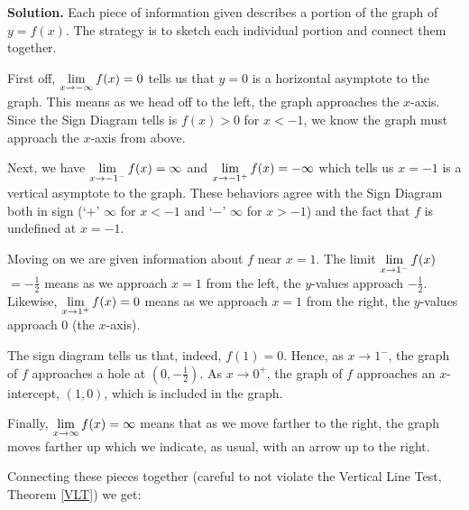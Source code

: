 \begin{ex}
\begin{center}
\end{center}



{\bf Solution.} Each piece of information given describes a portion of the graph of $y = f(x)$.  The strategy is to sketch each individual portion and connect them together.

\medskip

First off, $\displaystyle{\lim_{x \rightarrow -\infty} f(x) = 0}$ tells us that $y = 0$ is a horizontal asymptote to the graph.  This means as we head off to the left, the graph approaches the $x$-axis.  Since the Sign Diagram tells is $f(x) > 0$ for $x<-1$, we know the graph must approach the $x$-axis from above.

\medskip

Next, we have $\displaystyle{\lim_{x \rightarrow -1^{-}} f(x) = \infty}$ and  $\displaystyle{\lim_{x \rightarrow -1^{+}} f(x) = - \infty}$ which tells us $x=-1$ is a vertical asymptote to the graph.  These behaviors agree with the Sign Diagram both in sign (`$+$' $\infty$ for $x<-1$ and `$-$' $\infty$ for $x>-1$) and the fact that $f$ is undefined at $x = -1$.

\medskip

Moving on we are given information about $f$ near $x = 1$.    The limit $\displaystyle{\lim_{x \rightarrow 1^{-}} f(x)}$ $= -\frac{1}{2}$  means as we approach $x=1$ from the left, the $y$-values approach $-\frac{1}{2}$.  Likewise, $\displaystyle{\lim_{x \rightarrow 1^{+}} f(x) = 0}$ means as we approach $x=1$ from the right, the $y$-values approach $0$ (the $x$-axis).  

\medskip

The sign diagram tells us that, indeed, $f(1) = 0$.  Hence, as $x \rightarrow 1^{-}$,  the graph of $f$ approaches a hole at $\left(0, -\frac{1}{2}\right)$.  As $x \rightarrow 0^{+}$, the graph of $f$ approaches an $x$-intercept, $(1,0)$, which is included in the graph. 

\medskip

Finally,   $\displaystyle{\lim_{x \rightarrow \infty } f(x) = \infty}$  means that as we move farther to the right, the graph moves farther up which we indicate, as usual, with an arrow up to the right.

\medskip

Connecting these pieces together (careful to not violate the Vertical Line Test, Theorem \ref{VLT}) we get:

\begin{center}



\end{center}
\end{ex}
